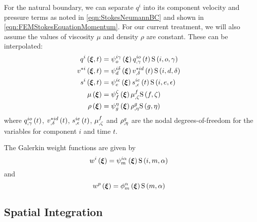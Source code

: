 For the natural boundary, we can separate $q^{i}$ into its component velocity
and pressure terms as noted in \ref{eqn:StokesNeumannBC} and shown in
\ref{eqn:FEMStokesEquationMomentum}. For our current treatment, we will also assume the values
of viscosity $\mu$ and density $\rho$ are constant. These can be interpolated:
\begin{equation}
  \begin{split}
    \fnof{q^{i}}{\vectr{\xi},t} &= \idxgbfn{i}{o}{\gamma}{\vectr{\xi}}
    \fnof{\idxnodedof{q}{i}{o}{\gamma}}{t}\idxgsf{i}{o}{\gamma} \\
    \fnof{v^{*i}}{\vectr{\xi},t} &=\idxgbfn{i}{d}{\delta}{\vectr{\xi}}
    \fnof{\idxnodedof{v}{*i}{d}{\delta}}{t}\idxgsf{i}{d}{\delta} \\
    \fnof{s^{i}}{\vectr{\xi},t} &=\idxgbfn{i}{e}{\epsilon}{\vectr{\xi}}
    \fnof{\idxnodedof{s}{i}{e}{\epsilon}}{t}\idxgsf{i}{e}{\epsilon} \\
    \fnof{\mu}{\vectr{\xi}} &=\gbfn{f}{\zeta}{\vectr{\xi}}
    \nodedof{\mu}{f}{\zeta}\gsf{f}{\zeta} \\
    \fnof{\rho}{\vectr{\xi}} &=\gbfn{g}{\eta}{\vectr{\xi}}\nodedof{\rho}{g}{\eta}
    \gsf{g}{\eta}
  \end{split}
\end{equation}
where $\fnof{\idxnodedof{q}{i}{o}{\gamma}}{t}$,
$\fnof{\idxnodedof{v}{*i}{d}{\delta}}{t}$, 
$\fnof{\idxnodedof{s}{i}{e}{\epsilon}}{t}$, $\nodedof{\mu}{f}{\zeta}$
and $\nodedof{\rho}{g}{\eta}$ are the nodal degrees-of-freedom for the
variables for component $i$ and time $t$.

The Galerkin weight functions are given by
\begin{equation}
  \fnof{w^{i}}{\vectr{\xi}}=\idxgbfn{i}{m}{\alpha}{\vectr{\xi}}\idxgsf{i}{m}{\alpha}
\end{equation}
and
\begin{equation}
  \fnof{w^{p}}{\vectr{\xi}}=\altgbfn{m}{\alpha}{\vectr{\xi}}\gsf{m}{\alpha}
\end{equation}

\subsection{Spatial Integration}

